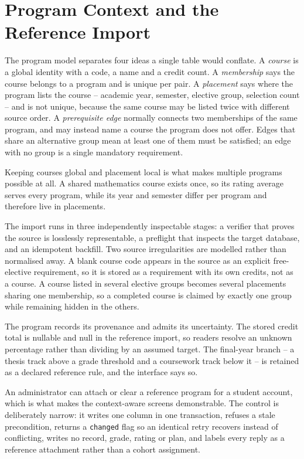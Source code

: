 \section{Program Context and the Reference Import}

The program model separates four ideas a single table would conflate. A \emph{course} is a global
identity with a code, a name and a credit count. A \emph{membership} says the course belongs to a
program and is unique per pair. A \emph{placement} says where the program lists the course --
academic year, semester, elective group, selection count -- and is not unique, because the same
course may be listed twice with different source order. A \emph{prerequisite edge} normally
connects two memberships of the same program, and may instead name a course the program does not
offer. Edges that share an alternative group mean at least one of them must be satisfied; an edge
with no group is a single mandatory requirement.

Keeping courses global and placement local is what makes multiple programs possible at all. A shared
mathematics course exists once, so its rating average serves every program, while its year and
semester differ per program and therefore live in placements.

The import runs in three independently inspectable stages: a verifier that proves the source is
losslessly representable, a preflight that inspects the target database, and an idempotent backfill.
Two source irregularities are modelled rather than normalised away. A blank course code appears in
the source as an explicit free-elective requirement, so it is stored as a requirement with its own
credits, not as a course. A course listed in several elective groups becomes several placements
sharing one membership, so a completed course is claimed by exactly one group while remaining
hidden in the others.

The program records its provenance and admits its uncertainty. The stored credit total is nullable
and null in the reference import, so readers resolve an unknown percentage rather than dividing by
an assumed target. The final-year branch -- a thesis track above a grade threshold and a coursework
track below it -- is retained as a declared reference rule, and the interface says so.

An administrator can attach or clear a reference program for a student account, which is what makes
the context-aware screens demonstrable. The control is deliberately narrow: it writes one column in
one transaction, refuses a stale precondition, returns a {\tt changed} flag so an identical retry
recovers instead of conflicting, writes no record, grade, rating or plan, and labels every reply as
a reference attachment rather than a cohort assignment.

